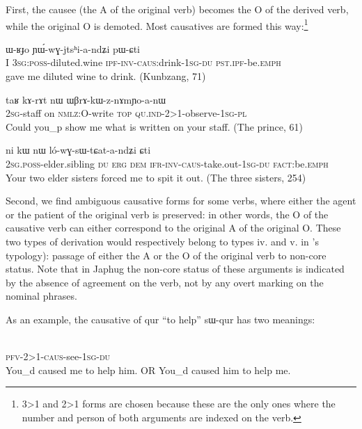 \documentclass[oldfontcommands,oneside,a4paper,11pt]{article}
\newcommand{\ipa}[1]{{\phon \mbox{#1}}} %
\newcommand{\sg}{\textsc{sg}}
\newcommand{\pl}{\textsc{pl}}
\newcommand{\wav}[1]{}%
\newcommand{\pfv}{\textsc{pfv}}
\newcommand{\caus}{\textsc{caus}}
\newcommand{\dem}{\textsc{dem}}
\newcommand{\du}{\textsc{du}}
\newcommand{\erg}{\textsc{erg}}
\newcommand{\emphat}{\textsc{emph}}
\newcommand{\evd}{\textsc{ifr}}
\newcommand{\inv}{\textsc{inv}}
\newcommand{\ipf}{\textsc{ipf}}
\newcommand{\nmlz}{\textsc{nmlz}}
\newcommand{\fact}{\textsc{fact}}
\newcommand{\poss}{\textsc{poss}}
\newcommand{\pst}{\textsc{pst}}
\newcommand{\topic}{\textsc{top}}
\newcommand{\quind}{\textsc{qu.ind}} %
\begin{document}
First, the causee (the A of the original verb) becomes the O of the derived verb, while the original O is demoted. Most causatives are formed this way:\footnote{3>1 and 2>1 forms are chosen because these are the only ones where the number and person of both arguments are indexed on the verb.}
 \begin{exe}
\ex
\gll  \ipa{aʑo} 	\ipa{ɯ-ʁɟo} 	\ipa{ɲɯ́-wɣ-jtsʰi-a-ndʑi} 	\ipa{pɯ-ɕti}  \\
  I 3\sg{}:\poss{}-diluted.wine \ipf{}-\inv{}-\caus{}:drink-1\sg{}-\du{} \pst{}.\ipf{}-be.\emphat{} \\
   gave me diluted wine to drink. (Kunbzang, 71)
\end{exe} 
 
 \begin{exe}
\ex
\gll  \ipa{nɤ-tɤɲi} 	\ipa{taʁ} 	\ipa{kɤ-rɤt} 	\ipa{nɯ} 	\ipa{ɯβrɤ-kɯ-z-nɤmɲo-a-nɯ} \\
  2\sg{}-staff on \nmlz{}:O-write \topic{} \quind{}-2>1-observe-1\sg{}-\pl{} \\
  \glt Could you_p show me what is written on your staff. (The prince, 61)
\end{exe} 

 \begin{exe}
\ex
\gll \ipa{nɤ-pi} 	\ipa{ni} 	\ipa{kɯ} 	\ipa{nɯ} 	\ipa{ló-wɣ-sɯ-tɕat-a-ndʑi} 	\ipa{ɕti}  \\
2\sg{}.\poss{}-elder.sibling \du{} \erg{} \dem{} \evd{}-\inv{}-\caus{}-take.out-1\sg{}-\du{} \fact{}:be.\emphat{} \\
  \glt Your two elder sisters forced me to spit it out. (The three sisters, 254)
\end{exe} 

Second, we find ambiguous causative forms for some verbs, where either the agent or the patient of the original verb is preserved: in other words, the O of the causative verb can either correspond to the original A of the original O. These two types of derivation would respectively belong to types iv. and v. in \citet[48]{dixon00causative}'s typology): passage of either the A or the O of the original verb to non-core status. Note that in Japhug the non-core status of these arguments is indicated by the absence of agreement on the verb, not by any overt marking on the nominal phrases. 
 
As an example, the causative of \ipa{qur} ``to help''  \ipa{sɯ-qur} has two meanings:

\begin{exe} 
\ex \label{ex:caus:show.2>3>1}
\gll   \ipa{tɤ-kɯ-sɯ-qur-a-ndʑi}  \\
 \pfv{}-2>1-\caus{}-see-1\sg{}-\du{}  \\
 \glt  You_d caused me to help him. OR You_d caused him to help me. \wav{8_tAkWsWqura}
\end{exe} 
\end{document}
